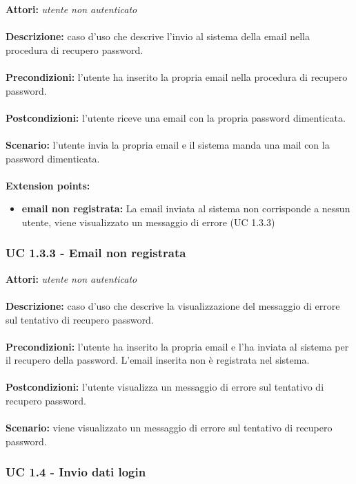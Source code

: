 \documentclass[a4paper,11pt]{article}
\begin{document}

\textbf{Attori:} \textit{utente non autenticato}
\\ \\
\textbf{Descrizione:} caso d'uso che descrive l'invio al sistema della email nella procedura di recupero password.\\
\\
\textbf{Precondizioni:} l'utente ha inserito la propria email nella procedura di recupero password.\\
\\
\textbf{Postcondizioni:} l’utente riceve una email con la propria password dimenticata.\\
\\
\textbf{Scenario:} l’utente invia la propria email e il sistema manda una mail con la password dimenticata.\\
\\
\textbf{Extension points:} 
\begin{itemize}
	\item \textbf{email non registrata:} La email inviata al sistema non corrisponde a nessun utente, viene visualizzato un messaggio di errore (UC 1.3.3)
\end{itemize}


\subsubsection{UC 1.3.3 - Email non registrata}

\textbf{Attori:} \textit{utente non autenticato}
\\ \\
\textbf{Descrizione:} caso d'uso che descrive la visualizzazione del messaggio di errore sul tentativo di recupero password.\\
\\
\textbf{Precondizioni:} l'utente ha inserito la propria email e l'ha inviata al sistema per il recupero della password. L'email inserita non è registrata nel sistema.\\
\\
\textbf{Postcondizioni:} l’utente visualizza un messaggio di errore sul tentativo di recupero password.\\
\\
\textbf{Scenario:} viene visualizzato un messaggio di errore sul tentativo di recupero password.\\


\subsubsection{UC 1.4 - Invio dati login}
\end{document}
